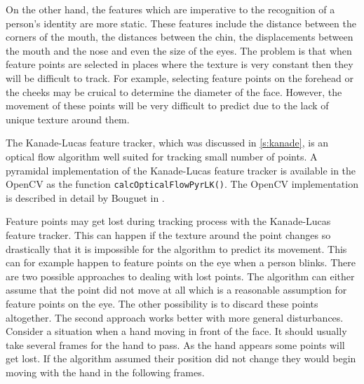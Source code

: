 \documentclass[11pt,a4paper]{report}
\begin{document}
On the other hand, the features which are imperative to the recognition of a
person's identity are more static. These features include the distance between the
corners of the mouth, the distances between the chin, the displacements between
the mouth and the nose and even the size of the eyes. The problem is that when feature points are selected in places where
the texture is very constant then they will be difficult to track. For example, selecting
feature points on the forehead or the cheeks may be cruical to determine the
diameter of the face. However, the movement of these points will be very
difficult to predict due to the lack of unique texture around them.

The Kanade-Lucas feature tracker, which was discussed in \ref{s:kanade}, is an
optical flow algorithm well suited for tracking small number of points. A
pyramidal implementation of the Kanade-Lucas feature tracker is available in the
OpenCV as the function \texttt{calcOpticalFlowPyrLK()}. The OpenCV
implementation is described in detail by Bouguet in \cite{kanade4}.  

Feature points may get lost during tracking process with the Kanade-Lucas
feature tracker. This can happen if the
texture around the point changes so drastically that it is impossible for the
algorithm to predict its movement. This can for example happen to feature points
on the eye when a person blinks. There are two possible approaches to dealing
with lost points. The algorithm can either assume that the point did not move at
all which is a reasonable assumption for feature points on the eye. The other
possibility is to discard these points altogether. The second approach works
better with more general disturbances. Consider a situation when a hand moving
in front of the face. It should usually take several frames for the hand to
pass. As the hand appears some points will get lost. If the algorithm assumed
their position did not change they would begin moving with the hand in the
following frames.
\end{document}
